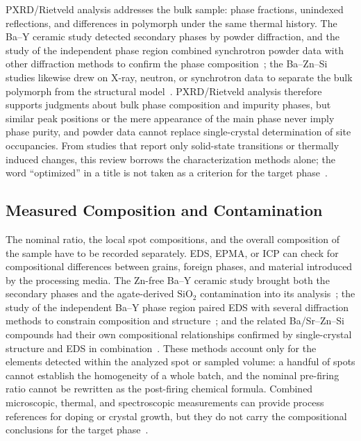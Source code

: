 PXRD\slash Rietveld analysis addresses the bulk sample: phase fractions, unindexed reflections, and differences in polymorph under the same thermal history. The Ba--Y ceramic study detected secondary phases by powder diffraction, and the study of the independent phase region combined synchrotron powder data with other diffraction methods to confirm the phase composition~\cite{yamane2024microstructure,gulay2024navigation}; the Ba--Zn--Si studies likewise drew on X-ray, neutron, or synchrotron data to separate the bulk polymorph from the structural model~\cite{lin1999phase,zou2021crystal}. PXRD\slash Rietveld analysis therefore supports judgments about bulk phase composition and impurity phases, but similar peak positions or the mere appearance of the main phase never imply phase purity, and powder data cannot replace single-crystal determination of site occupancies. From studies that report only solid-state transitions or thermally induced changes, this review borrows the characterization methods alone; the word ``optimized'' in a title is not taken as a criterion for the target phase~\cite{kerstan2012thermal,cai2024optimized}.

\subsection{Measured Composition and Contamination}

The nominal ratio, the local spot compositions, and the overall composition of the sample have to be recorded separately. EDS, EPMA, or ICP can check for compositional differences between grains, foreign phases, and material introduced by the processing media. The Zn-free Ba--Y ceramic study brought both the secondary phases and the agate-derived $\mathrm{SiO_2}$ contamination into its analysis~\cite{yamane2024microstructure}; the study of the independent Ba--Y phase region paired EDS with several diffraction methods to constrain composition and structure~\cite{gulay2024navigation}; and the related Ba\slash Sr--Zn--Si compounds had their own compositional relationships confirmed by single-crystal structure and EDS in combination~\cite{thieme2015ba1}. These methods account only for the elements detected within the analyzed spot or sampled volume: a handful of spots cannot establish the homogeneity of a whole batch, and the nominal pre-firing ratio cannot be rewritten as the post-firing chemical formula. Combined microscopic, thermal, and spectroscopic measurements can provide process references for doping or crystal growth, but they do not carry the compositional conclusions for the target phase~\cite{tejas2024structural,pang2005study}.

